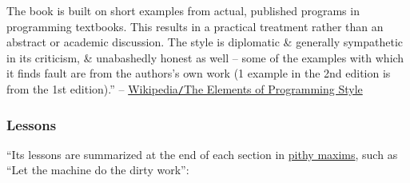 \documentclass{article}
\begin{document}
The book is built on short examples from actual, published programs in programming textbooks. This results in a practical treatment rather than an abstract or academic discussion. The style is diplomatic \& generally sympathetic in its criticism, \& unabashedly honest as well -- some of the examples with which it finds fault are from the authors's own work (1 example in the 2nd edition is from the 1st edition).'' -- \href{https://en.wikipedia.org/wiki/The_Elements_of_Programming_Style}{Wikipedia{\tt/}The Elements of Programming Style}

\subsubsection{Lessons}
``Its lessons are summarized at the end of each section in \href{https://en.wikipedia.org/wiki/Aphorism}{pithy maxims}, such as ``Let the machine do the dirty work'':
\end{document}

